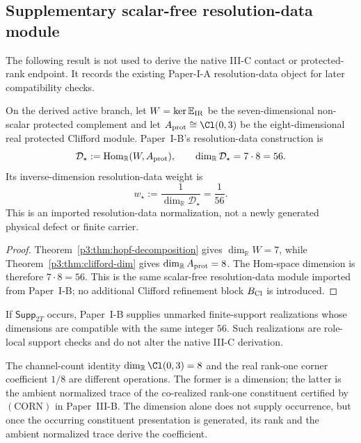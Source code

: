 \documentclass[11pt,a4paper]{article}
\begin{document}
\subsection{Supplementary scalar-free resolution-data module}
\label{p3c:app:resolution-data-56}
The following result is not used to derive the native III-C contact or
protected-rank endpoint.  It records the existing Paper-I-A resolution-data
object for later compatibility checks.

\begin{theorem}
\label{p3:thm:protected-clifford-master-index}
On the derived active branch, let
\(W=\ker\mathbb E_{\rm IR}\) be the seven-dimensional non-scalar protected
complement and let \(A_{\rm prot}\cong\Cl(0,3)\) be the eight-dimensional real
protected Clifford module.  Paper~I-B's resolution-data construction is
\[
        \mathcal D_\star
        :=\operatorname{Hom}_{\mathbb R}(W,A_{\rm prot}),
        \qquad
        \dim_{\mathbb R}\mathcal D_\star=7\cdot8=56.
\]
Its inverse-dimension resolution-data weight is
\[
        w_\star:=\frac1{\dim_{\mathbb R}\mathcal D_\star}=\frac1{56}.
\]
This is an imported resolution-data normalization, not a newly generated
physical defect or finite carrier.
\end{theorem}

\begin{proof}
Theorem~\ref{p3:thm:hopf-decomposition} gives \(\dim_{\mathbb R}W=7\), while
Theorem~\ref{p3:thm:clifford-dim} gives
\(\dim_{\mathbb R}A_{\rm prot}=8\).  The Hom-space dimension is therefore
\(7\cdot8=56\).  This is the same scalar-free resolution-data module imported
from Paper~I-B; no additional Clifford refinement block \(B_{\rm Cl}\) is
introduced.
\end{proof}

\begin{remark}
\label{p3:rem:hurwitz-link-master-index}
If \(\mathsf{Supp}_{2T}\) occurs, Paper~I-B supplies unmarked finite-support
realizations whose dimensions are compatible with the same integer \(56\).
Such realizations are role-local support checks and do not
alter the native III-C derivation.
\end{remark}

\begin{corollary}
\label{p3:cor:repeated-octet-factors-not-independent}
The channel-count identity \(\dim_{\mathbb R}\Cl(0,3)=8\) and the real
rank-one corner coefficient \(1/8\) are different operations.  The former is
a dimension; the latter is the ambient normalized trace of the co-realized
rank-one constituent certified by \((\mathrm{CORN})\) in Paper~III-B.  The
dimension alone does not supply occurrence, but once the occurring constituent
presentation is generated, its rank and the ambient normalized trace derive
the coefficient.
\end{corollary}
\end{document}
